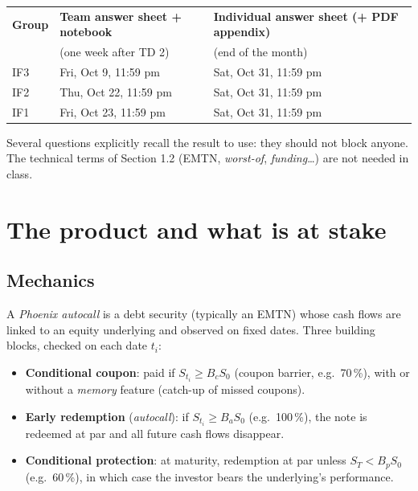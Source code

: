 \documentclass[11pt,a4paper]{article}
\begin{document}
\begin{center}
\small
\begin{tabular}{@{}l l l@{}}
\toprule
\textbf{Group} & \textbf{Team answer sheet + notebook} & \textbf{Individual answer sheet (+ PDF appendix)} \\
               & (one week after TD 2)                  & (end of the month) \\
\midrule
IF3 & Fri, Oct 9, 11:59 pm  & Sat, Oct 31, 11:59 pm \\
IF2 & Thu, Oct 22, 11:59 pm & Sat, Oct 31, 11:59 pm \\
IF1 & Fri, Oct 23, 11:59 pm & Sat, Oct 31, 11:59 pm \\
\bottomrule
\end{tabular}
\end{center}


Several questions explicitly recall the result to use: they should not block anyone. The technical terms
of Section 1.2 (EMTN, \emph{worst-of}, \emph{funding}\ldots) are not needed in class.

\section{The product and what is at stake}

\subsection{Mechanics}

A \emph{Phoenix autocall} is a debt security (typically an EMTN) whose cash flows are linked to an equity
underlying and observed on fixed dates. Three building blocks, checked on each date $t_i$:
\begin{itemize}
  \item \textbf{Conditional coupon}: paid if $S_{t_i} \geq B_c S_0$ (coupon barrier, e.g.\ 70\,\%), with or without a \emph{memory}
  feature (catch-up of missed coupons).
  \item \textbf{Early redemption} (\emph{autocall}): if $S_{t_i} \geq B_a S_0$ (e.g.\ 100\,\%), the note is redeemed at par and all
  future cash flows disappear.
  \item \textbf{Conditional protection}: at maturity, redemption at par unless $S_T < B_p S_0$ (e.g.\ 60\,\%), in which
  case the investor bears the underlying's performance.
\end{itemize}
\end{document}
